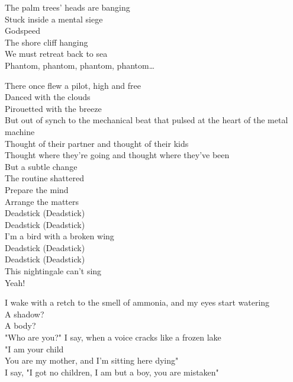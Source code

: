 The palm trees' heads are banging \\
Stuck inside a mental siege \\
Godspeed \\
The shore cliff hanging \\
We must retreat back to sea \\

Phantom, phantom, phantom, phantom… \\




There once flew a pilot, high and free \\
Danced with the clouds \\
Pirouetted with the breeze \\
But out of synch to the mechanical beat that pulsed at the heart of the metal machine \\
Thought of their partner and thought of their kids \\
Thought where they're going and thought where they've been \\
But a subtle change \\
The routine shattered \\
Prepare the mind \\
Arrange the matters \\

Deadstick (Deadstick) \\
Deadstick (Deadstick) \\
I'm a bird with a broken wing \\
Deadstick (Deadstick) \\
Deadstick (Deadstick) \\
This nightingale can't sing \\
Yeah! \\


I wake with a retch to the smell of ammonia, and my eyes start watering \\
A shadow? \\
A body? \\
"Who are you?" I say, when a voice cracks like a frozen lake \\
"I am your child \\
You are my mother, and I'm sitting here dying" \\
I say, "I got no children, I am but a boy, you are mistaken" \\

